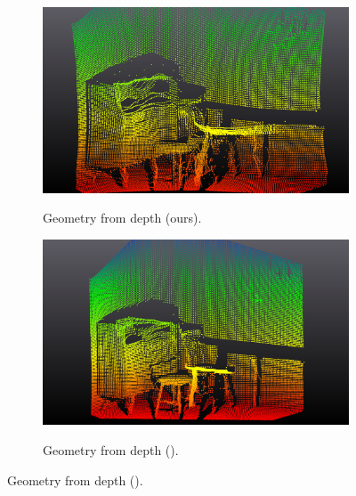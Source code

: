 \begin{figure}
\begin{minipage}{0.49\linewidth}
  \vspace{0.03\linewidth} %

  \begin{subfigure}[b]{0.45\linewidth}
    \centering
    \includegraphics[width=\linewidth]{figs/depthply_ours.png}
    \label{subfig:sub3}
   \vspace*{-3mm} %
   \caption{Geometry from depth (ours).}
  \end{subfigure}
  \hfill
  \begin{subfigure}[b]{0.45\linewidth}
    \centering
    \includegraphics[width=\linewidth]{figs/depthply_pan.png}
    \label{subfig:sub4}
   \vspace*{-3mm} %
   \caption{Geometry from depth (\citep{dahnert2021panoptic}).}
  \end{subfigure}


\end{minipage}
\end{figure}
